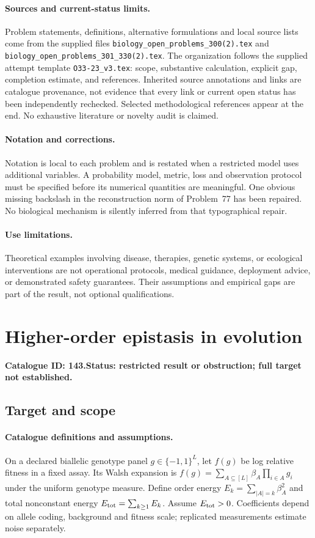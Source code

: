 \documentclass[11pt]{article}
\begin{document}
\paragraph{Sources and current-status limits.}
Problem statements, definitions, alternative formulations and local source lists
come from the supplied files
\texttt{biology\_open\_problems\_300(2).tex} and
\texttt{biology\_open\_problems\_301\_330(2).tex}.
The organization follows the supplied attempt template
\texttt{O33-23\_v3.tex}: scope, substantive calculation, explicit gap,
completion estimate, and references. Inherited source annotations and links are
catalogue provenance, not evidence that every link or current open status has
been independently rechecked. Selected methodological references appear at the
end. No exhaustive literature or novelty audit is claimed.

\paragraph{Notation and corrections.}
Notation is local to each problem and is restated when a restricted model uses
additional variables. A probability model, metric, loss and observation protocol
must be specified before its numerical quantities are meaningful. One obvious
missing backslash in the reconstruction norm of Problem~77 has been repaired.
No biological mechanism is silently inferred from that typographical repair.

\paragraph{Use limitations.}
Theoretical examples involving disease, therapies, genetic systems, or ecological
interventions are not operational protocols, medical guidance, deployment advice,
or demonstrated safety guarantees. Their assumptions and empirical gaps are part
of the result, not optional qualifications.

\setcounter{section}{142}
\section{Higher-order epistasis in evolution}
\label{prob:143}
\noindent\textbf{Catalogue ID: 143.}\quad \textbf{Status: restricted result or obstruction; full target not established.}
\subsection{Target and scope}
\paragraph{Catalogue definitions and assumptions.}
On a declared biallelic genotype panel $g\in\{-1,1\}^L$, let $f(g)$ be log relative fitness in a fixed assay. Its Walsh expansion is $f(g)=\sum_{A\subseteq[L]}\beta_A\prod_{i\in A}g_i$ under the uniform genotype measure. Define order energy $E_k=\sum_{|A|=k}\beta_A^2$ and total nonconstant energy $E_{\rm tot}=\sum_{k\geq1}E_k$. Assume $E_{\rm tot}>0$. Coefficients depend on allele coding, background and fitness scale; replicated measurements estimate noise separately.
\end{document}
